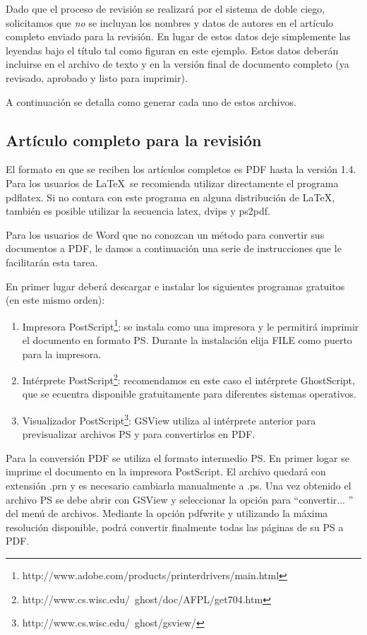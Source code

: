 \documentclass[conference,a4paper,10pt,oneside,final]{tfmpd}
\begin{document}
Dado que el proceso de revisión se realizará por el sistema de doble ciego, solicitamos que \textit{no} se incluyan los nombres y datos de autores en el artículo completo enviado para la revisión. En lugar de estos datos deje simplemente las leyendas bajo el título tal como figuran en este ejemplo. Estos datos deberán incluirse en el archivo de texto y en la versión final de documento completo (ya revisado, aprobado y listo para imprimir).

A continuación se detalla como generar cada uno de estos archivos.

\subsection{Artículo completo para la revisión}

El formato en que se reciben los artículos completos es PDF hasta la versión 1.4. Para los usuarios de \LaTeX\ se recomienda utilizar directamente el programa pdflatex. Si no contara con este programa en alguna distribución de \LaTeX, también es posible utilizar la secuencia latex, dvips y ps2pdf.

Para los usuarios de Word que no conozcan un método para convertir sus documentos a PDF, le damos a continuación una serie de instrucciones que le facilitarán esta tarea.

En primer lugar deberá descargar e instalar los siguientes programas 
gratuitos (en este mismo orden):

\begin{enumerate}
\item Impresora PostScript\footnote{http://www.adobe.com/products/printerdrivers/main.html}:
se instala como una impresora y le permitirá imprimir el documento en formato PS. Durante la instalación elija FILE como puerto para la impresora.

\item Intérprete PostScript\footnote{http://www.cs.wisc.edu/~ghost/doc/AFPL/get704.htm}:
recomendamos en este caso el intérprete GhostScript, que se ecuentra disponible gratuitamente para diferentes sistemas operativos.

\item Visualizador PostScript\footnote{http://www.cs.wisc.edu/~ghost/gsview/}:
GSView utiliza al intérprete anterior para previsualizar archivos PS y para convertirlos en PDF.
\end{enumerate}

Para la conversión PDF se utiliza el formato intermedio PS. En primer logar se imprime el documento en la impresora PostScript. El archivo quedará con extensión .prn y es necesario cambiarla manualmente a .ps. Una vez obtenido el archivo PS se debe abrir con GSView y seleccionar la opción para ``convertir... '' del menú de archivos. Mediante 
la opción pdfwrite y utilizando la máxima resolución disponible, podrá convertir finalmente todas las páginas de su PS a PDF.
\end{document}

